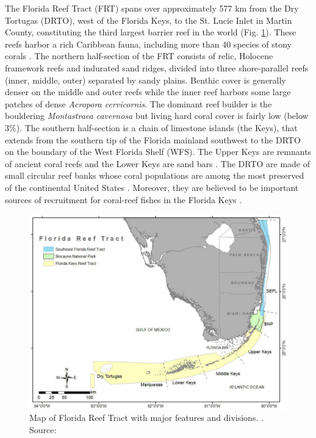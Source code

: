 The Florida Reef Tract (FRT) spans over approximately 577 km from the Dry Tortugas (DRTO), west of the Florida Keys, to the St. Lucie Inlet in Martin County, constituting the third largest barrier reef in the world \citep{finkl2008shelf} (Fig. \ref{intro:frt}). These reefs harbor a rich Caribbean fauna, including more than 40 species of stony corals \citep{banks2008reef,jackson2014status}. The northern half-section of the FRT consists of relic, Holocene framework reefs and indurated sand ridges, divided into three shore-parallel reefs (inner, middle, outer) separated by sandy plains. Benthic cover is generally denser on the middle and outer reefs while the inner reef harbors some large patches of dense \textit{Acropora cervicornis}. The dominant reef builder is the bouldering \textit{Montastraea cavernosa} but living hard coral cover is fairly low (below 3\%)\citep{banks2008reef,walton2018impacts}. The southern half-section is a chain of limestone islands (the Keys), that extends from the southern tip of the Florida mainland southwest to the DRTO on the boundary of the West Florida Shelf (WFS). The Upper Keys are remnants of ancient coral reefs and the Lower Keys are sand bars \citep{hoffmeister1968geology}. The DRTO are made of small circular reef banks whose coral populations are among the most preserved of the continental United States \citep{hine2008coral, kourafalou2018physical}. Moreover, they are believed to be important sources of recruitment for coral-reef fishes in the Florida Keys \citep{domeier2004potential}. 

\begin{figure}
    \centering
    \includegraphics[width=\textwidth]{chapters/intro/figures/frt.png}
    \caption{Map of Florida Reef Tract with major features and divisions. . Source: \cite{kupfner2019untapped}}
    \label{intro:frt}
\end{figure}

